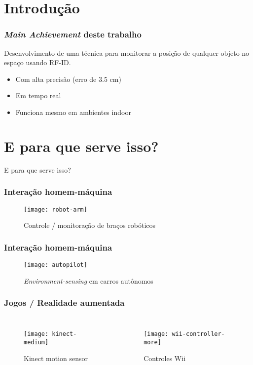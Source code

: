 \section{Introdução}


\begin{frame}
  \frametitle{\emph{Main Achievement} deste trabalho}

    Desenvolvimento de uma técnica para \alert{monitorar a posição de qualquer objeto no espaço usando RF-ID}.

    \begin{itemize}
      \item Com \alert{alta precisão} (erro de 3.5 cm)
      \item Em \alert{tempo real}
      \item Funciona mesmo em ambientes \alert{indoor}
    \end{itemize}
\end{frame}

\section{E para que serve isso?}

\begin{frame}
  \begin{center}
    \Huge E para que serve isso?
  \end{center}
\end{frame}

\begin{frame}
  \frametitle{Interação homem-máquina}
  \begin{figure}
    \texttt{[image: robot-arm]}
		\caption*{Controle / monitoração de braços robóticos}
  \end{figure}
\end{frame}

\begin{frame}
  \frametitle{Interação homem-máquina}
  \begin{figure}
    \texttt{[image: autopilot]}
		\caption*{\emph{Environment-sensing} em carros autônomos}
  \end{figure}
\end{frame}

\begin{frame}
  \frametitle{Jogos / Realidade aumentada}
    \begin{columns}[T,onlytextwidth]
					\begin{figure}
							\texttt{[image: kinect-medium]}
						\captionsetup{labelformat=empty}
						\caption{Kinect motion sensor}
					\end{figure}

					\begin{figure}
							\texttt{[image: wii-controller-more]}
						\captionsetup{labelformat=empty}
						\caption{Controles Wii}
					\end{figure}
    \end{columns}
\end{frame}

